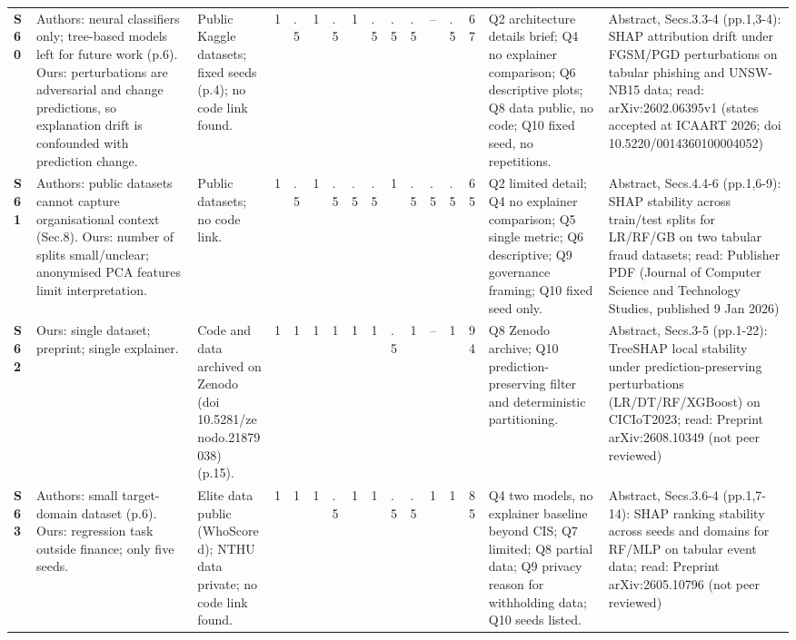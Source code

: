 \begin{longtable}{@{}P{1.0cm}P{4.6cm}P{3.6cm}P{0.3cm}P{0.3cm}P{0.3cm}P{0.3cm}P{0.3cm}P{0.3cm}P{0.3cm}P{0.3cm}P{0.3cm}P{0.36cm}P{0.75cm}P{3.0cm}P{3.9cm}@{}}
\textbf{S60} & Authors: neural classifiers only; tree-based models left for future work (p.6). Ours: perturbations are adversarial and change predictions, so explanation drift is confounded with prediction change. & Public Kaggle datasets; fixed seeds (p.4); no code link found. & 1 & .5 & 1 & .5 & 1 & .5 & .5 & .5 & -- & .5 & 67 & Q2 architecture details brief; Q4 no explainer comparison; Q6 descriptive plots; Q8 data public, no code; Q10 fixed seed, no repetitions. & Abstract, Secs.3.3-4 (pp.1,3-4): SHAP attribution drift under FGSM/\allowbreak{}PGD perturbations on tabular phishing and UNSW-NB15 data; read: arXiv:2602.06395v1 (states accepted at ICAART 2026; doi 10.5220/\allowbreak{}0014360100004052) \\
\textbf{S61} & Authors: public datasets cannot capture organisational context (Sec.8). Ours: number of splits small/\allowbreak{}unclear; anonymised PCA features limit interpretation. & Public datasets; no code link. & 1 & .5 & 1 & .5 & .5 & .5 & 1 & .5 & .5 & .5 & 65 & Q2 limited detail; Q4 no explainer comparison; Q5 single metric; Q6 descriptive; Q9 governance framing; Q10 fixed seed only. & Abstract, Secs.4.4-6 (pp.1,6-9): SHAP stability across train/\allowbreak{}test splits for LR/\allowbreak{}RF/\allowbreak{}GB on two tabular fraud datasets; read: Publisher PDF (Journal of Computer Science and Technology Studies, published 9 Jan 2026) \\
\textbf{S62} & Ours: single dataset; preprint; single explainer. & Code and data archived on Zenodo (doi 10.5281/\allowbreak{}zenodo.21879038) (p.15). & 1 & 1 & 1 & 1 & 1 & 1 & .5 & 1 & -- & 1 & 94 & Q8 Zenodo archive; Q10 prediction-preserving filter and deterministic partitioning. & Abstract, Secs.3-5 (pp.1-22): TreeSHAP local stability under prediction-preserving perturbations (LR/\allowbreak{}DT/\allowbreak{}RF/\allowbreak{}XGBoost) on CICIoT2023; read: Preprint arXiv:2608.10349 (not peer reviewed) \\
\textbf{S63} & Authors: small target-domain dataset (p.6). Ours: regression task outside finance; only five seeds. & Elite data public (WhoScored); NTHU data private; no code link found. & 1 & 1 & 1 & .5 & 1 & 1 & .5 & .5 & 1 & 1 & 85 & Q4 two models, no explainer baseline beyond CIS; Q7 limited; Q8 partial data; Q9 privacy reason for withholding data; Q10 seeds listed. & Abstract, Secs.3.6-4 (pp.1,7-14): SHAP ranking stability across seeds and domains for RF/\allowbreak{}MLP on tabular event data; read: Preprint arXiv:2605.10796 (not peer reviewed) \\

\end{longtable}
